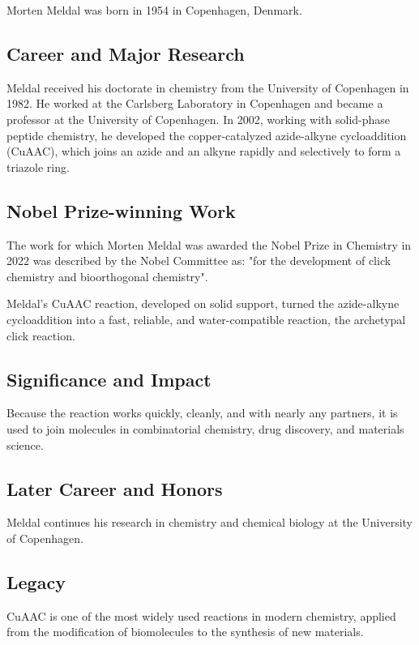 Morten Meldal was born in 1954 in Copenhagen, Denmark.

\subsection*{Career and Major Research}

Meldal received his doctorate in chemistry from the University of Copenhagen in 1982. He worked at the Carlsberg Laboratory in Copenhagen and became a professor at the University of Copenhagen. In 2002, working with solid-phase peptide chemistry, he developed the copper-catalyzed azide-alkyne cycloaddition (CuAAC), which joins an azide and an alkyne rapidly and selectively to form a triazole ring.

\subsection*{Nobel Prize-winning Work}

The work for which Morten Meldal was awarded the Nobel Prize in Chemistry in 2022 was described by the Nobel Committee as: "for the development of click chemistry and bioorthogonal chemistry".

Meldal's CuAAC reaction, developed on solid support, turned the azide-alkyne cycloaddition into a fast, reliable, and water-compatible reaction, the archetypal click reaction.

\subsection*{Significance and Impact}

Because the reaction works quickly, cleanly, and with nearly any partners, it is used to join molecules in combinatorial chemistry, drug discovery, and materials science.

\subsection*{Later Career and Honors}

Meldal continues his research in chemistry and chemical biology at the University of Copenhagen.

\subsection*{Legacy}

CuAAC is one of the most widely used reactions in modern chemistry, applied from the modification of biomolecules to the synthesis of new materials.

